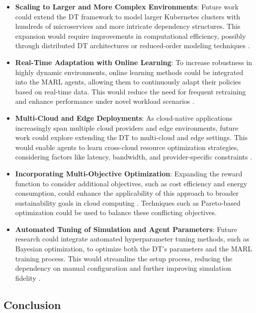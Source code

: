 \documentclass[conference]{IEEEtran}
\begin{document}
\begin{itemize}
    \item \textbf{Scaling to Larger and More Complex Environments}: Future work could extend the DT framework to model larger Kubernetes clusters with hundreds of microservices and more intricate dependency structures. This expansion would require improvements in computational efficiency, possibly through distributed DT architectures or reduced-order modeling techniques \cite{schleich_digital_twin}.
    
    \item \textbf{Real-Time Adaptation with Online Learning}: To increase robustness in highly dynamic environments, online learning methods could be integrated into the MARL agents, allowing them to continuously adapt their policies based on real-time data. This would reduce the need for frequent retraining and enhance performance under novel workload scenarios \cite{schwartz_drl_cloud}.
    
    \item \textbf{Multi-Cloud and Edge Deployments}: As cloud-native applications increasingly span multiple cloud providers and edge environments, future work could explore extending the DT to multi-cloud and edge settings. This would enable agents to learn cross-cloud resource optimization strategies, considering factors like latency, bandwidth, and provider-specific constraints \cite{liu_dt_cloud}.
    
    \item \textbf{Incorporating Multi-Objective Optimization}: Expanding the reward function to consider additional objectives, such as cost efficiency and energy consumption, could enhance the applicability of this approach to broader sustainability goals in cloud computing \cite{wu_multi_objective_rl}. Techniques such as Pareto-based optimization could be used to balance these conflicting objectives.
    
    \item \textbf{Automated Tuning of Simulation and Agent Parameters}: Future research could integrate automated hyperparameter tuning methods, such as Bayesian optimization, to optimize both the DT's parameters and the MARL training process. This would streamline the setup process, reducing the dependency on manual configuration and further improving simulation fidelity \cite{schulman_ppo}.
\end{itemize}

\subsection{Conclusion}
\end{document}
